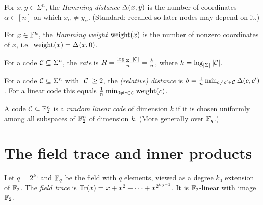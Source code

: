 \begin{definition}
  \label{def:hamming-distance}
  \mathlibok
  For $x,y \in \Sigma^n$, the \emph{Hamming distance} $\Delta(x,y)$ is the number
  of coordinates $\alpha \in [n]$ on which $x_\alpha \neq y_\alpha$. (Standard;
  recalled so later nodes may depend on it.)
\end{definition}

\begin{definition}
  \label{def:weight}
  \mathlibok
  For $x \in \mathbb{F}^n$, the \emph{Hamming weight} $\operatorname{weight}(x)$ is the number of nonzero
  coordinates of $x$, i.e.\ $\operatorname{weight}(x) = \Delta(x,0)$.
\end{definition}

\begin{definition}[Rate]
  \label{def:rate}
  For a code $\mathcal{C} \subseteq \Sigma^n$, the \emph{rate} is
  $R = \frac{\log_{|\Sigma|}|\mathcal{C}|}{n} = \frac{k}{n}$, where $k =
  \log_{|\Sigma|}|\mathcal{C}|$.
\end{definition}

\begin{definition}
  \label{def:relative-distance}
  For a code $\mathcal{C} \subseteq \Sigma^n$ with $|\mathcal{C}| \geq 2$, the
  \emph{(relative) distance} is
  $\delta = \frac{1}{n}\min_{c \neq c' \in \mathcal{C}} \Delta(c,c')$. For a linear
  code this equals $\frac{1}{n}\min_{0 \neq c \in \mathcal{C}}\operatorname{weight}(c)$.
\end{definition}

\begin{definition}
  \label{def:random-linear-code}
  A code $\mathcal{C} \subseteq \mathbb{F}_2^n$ is a \emph{random linear code} of dimension
  $k$ if it is chosen uniformly among all subspaces of $\mathbb{F}_2^n$ of dimension
  $k$. (More generally over $\mathbb{F}_q$.)
\end{definition}

\section{The field trace and inner products}

\begin{definition}
  \label{def:trace}
  \mathlibok
  Let $q = 2^{k_0}$ and $\mathbb{F}_q$ be the field with $q$ elements, viewed as a degree
  $k_0$ extension of $\mathbb{F}_2$. The \emph{field trace} is
  $\operatorname{Tr}(x) = x + x^2 + \cdots + x^{2^{k_0-1}}$. It is $\mathbb{F}_2$-linear with image
  $\mathbb{F}_2$.
\end{definition}

